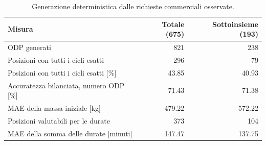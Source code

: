 \begin{table}[H]
\centering
\small
\begin{tabular}{@{}lrr@{}}
\toprule
\textbf{Misura} & \textbf{Totale (675)} & \textbf{Sottoinsieme (193)}\\
\midrule
ODP generati & \num{821} & \num{238}\\
Posizioni con tutti i cicli esatti & \num{296} & \num{79}\\
Posizioni con tutti i cicli esatti [\%] & \num{43.85} & \num{40.93}\\
Accuratezza bilanciata, numero ODP [\%] & \num{71.43} & \num{71.38}\\
MAE della massa iniziale [kg] & \num{479.22} & \num{572.22}\\
Posizioni valutabili per le durate & \num{373} & \num{104}\\
MAE della somma delle durate [minuti] & \num{147.47} & \num{137.75}\\
\bottomrule
\end{tabular}
\caption{Generazione deterministica dalle richieste commerciali osservate.}
\label{tab:cascade-generation-results}
\end{table}
